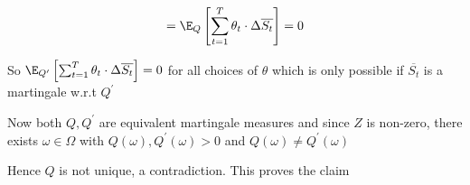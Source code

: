 \begin{prf}{}
\begin{equation*}
\begin{gathered}
    =\E_Q\left[\sum_{t=1}^{T}\theta_t\cdot\Delta\overline{S_t}\right]=0
  \end{gathered}
\end{equation*}
\par\bigskip
\noindent So $\E_{Q^{\prime}}\left[\sum_{t=1}^{T}\theta_t\cdot\Delta\overline{S_t}\right]=0$ for all choices of $\theta$ which is only possible if $\overline{S_t}$ is a martingale w.r.t $Q^{\prime}$
\par\bigskip
\noindent Now both $Q,Q^{\prime}$ are equivalent martingale measures and since $Z$ is non-zero, there exists $\omega\in\Omega$ with $Q(\omega),Q^{\prime}(\omega)>0$ and $Q(\omega)\neq Q^{\prime}(\omega)$\par
\noindent Hence $Q$ is not unique, a contradiction. This proves the claim
\end{prf}
